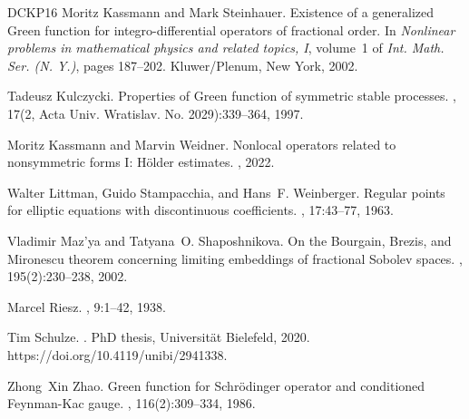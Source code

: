 \documentclass[reqno]{amsart}
\theoremstyle{plain}
\theoremstyle{definition}
\numberwithin{equation}{section}
\begin{document}
\begin{thebibliography}{DCKP16}
	Moritz Kassmann and Mark Steinhauer.
	\newblock Existence of a generalized {G}reen function for integro-differential
	operators of fractional order.
	\newblock In {\em Nonlinear problems in mathematical physics and related
		topics, {I}}, volume~1 of {\em Int. Math. Ser. (N. Y.)}, pages 187--202.
	Kluwer/Plenum, New York, 2002.
	
	Tadeusz Kulczycki.
	\newblock Properties of {G}reen function of symmetric stable processes.
	, 17(2, Acta Univ. Wratislav. No.
	2029):339--364, 1997.
	
	Moritz Kassmann and Marvin Weidner.
	\newblock Nonlocal operators related to nonsymmetric forms {I}: {H}\"older estimates.
	, 2022.

	Walter Littman, Guido Stampacchia, and Hans~F. Weinberger.
	\newblock Regular points for elliptic equations with discontinuous
	coefficients.
	, 17:43--77, 1963.
	
	Vladimir Maz'ya and Tatyana~O. Shaposhnikova.
	\newblock On the {B}ourgain, {B}rezis, and {M}ironescu theorem concerning
	limiting embeddings of fractional {S}obolev spaces.
	, 195(2):230--238, 2002.
	
	Marcel {Riesz}.
	, 9:1--42, 1938.
	
	Tim Schulze.
	.
	\newblock PhD thesis, Universit\"{a}t Bielefeld, 2020.
	\newblock https://doi.org/10.4119/unibi/2941338.
	
	Zhong~Xin Zhao.
	\newblock Green function for {S}chr\"{o}dinger operator and conditioned
	{F}eynman-{K}ac gauge.
	, 116(2):309--334, 1986.
	
\end{thebibliography}
\end{document}
